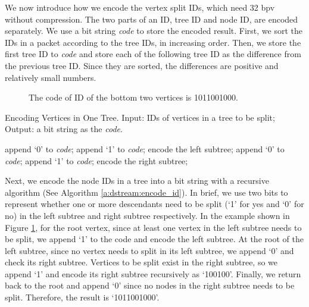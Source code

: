     We now introduce how we encode the vertex split IDs, 
    which need 32 bpv without compression.  
    The two parts of an ID, tree ID and node ID, are encoded separately.  We use a bit string \textit{code} to store the encoded result.
    First, we sort the IDs in a packet according to the tree IDs, in increasing order. 
    Then, we store the first tree ID to \textit{code} and 
    store each of the following tree ID as the difference from the previous tree ID.
    Since they are sorted, the differences are positive and relatively small numbers.

    \begin{figure}
    \centering
    \caption{The code of ID of the bottom two
    vertices is 1011001000. 
    \label{f:dstream:encode_id}}
    \end{figure}
    \begin{algorithm}
    \caption{Encoding Vertices in One Tree.
    Input: IDs of vertices in a tree to be split;
    Output: a bit string as the \emph{code}.\label{a:dstream:encode_id}}
    \begin{algorithmic}
        \STATE append `0' to \emph{code};
    \ELSE
        \STATE append `1' to \emph{code};
        \STATE encode the left subtree;
    \ENDIF
        \STATE append `0' to \emph{code};
    \ELSE
        \STATE append `1' to \emph{code};
        \STATE encode the right subtree;
    \ENDIF
    \end{algorithmic}
    \end{algorithm}
    Next, we encode the node IDs in a tree into a bit string with 
    a recursive algorithm (See Algorithm \ref{a:dstream:encode_id}).
    In brief, we use two bits to represent whether one or more descendants need
    to be split (`1' for yes and `0' for no)
    in the left subtree and right subtree respectively. 
    In the example shown in Figure \ref{f:dstream:encode_id}, for the root vertex, since at least one vertex
    in the left subtree needs to be split, we append `1' to the code and encode the
    left subtree. At the root of the left subtree, since no vertex needs to split in its left
    subtree, we append `0' and check its right subtree. Vertices to be split exist in the right
    subtree, so we append `1' and encode its right subtree recursively as `100100'. 
    Finally, we return back to the root and append `0' since 
    no nodes in the right subtree needs to be split. 
    Therefore, the result is `1011001000'.
        
